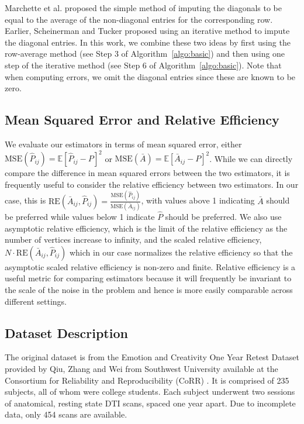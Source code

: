 \documentclass[10pt,letterpaper]{article}
\newcommand{\Ex}{\mathbb{E}}
\renewcommand{\hat}{\widehat}
\begin{document}
Marchette et al. \cite{marchette2011vertex}  proposed the simple method of imputing the diagonals to be equal to the average of the non-diagonal entries for the corresponding row.
Earlier, Scheinerman and Tucker \cite{scheinerman2010modeling} proposed using an iterative method to impute the diagonal entries.
In this work, we combine these two ideas by first using the row-average method  (see Step 3 of Algorithm~\ref{algo:basic}) and then using one step of the iterative method (see Step 6 of Algorithm~\ref{algo:basic}).
Note that when computing errors, we omit the diagonal entries since these are known to be zero.

\subsection{Mean Squared Error and Relative Efficiency}
\label{section:rel_eff}
We evaluate our estimators in terms of mean squared error, either $\mathrm{MSE}(\hat{P}_{ij})=\Ex[\hat{P}_{ij}-P]^2$ or $\mathrm{MSE}(\bar{A})=\Ex[\bar{A}_{ij}-P]^2$.
While we can directly compare the difference in mean squared errors between the two estimators, it is frequently useful to consider the relative efficiency between two estimators.
In our case, this is $\mathrm{RE}(\bar{A}_{ij},\hat{P}_{ij}) = \frac{\mathrm{MSE}(\hat{P}_{ij})}{\mathrm{MSE}(\bar{A}_{ij})}$, with values above 1 indicating $\bar{A}$ should be preferred while values below 1 indicate $\hat{P}$ should be preferred.
We also use asymptotic relative efficiency, which is the limit of the relative efficiency as the number of vertices increase to infinity, and the scaled relative efficiency, $N\cdot \mathrm{RE}(\bar{A}_{ij},\hat{P}_{ij}) $ which in our case normalizes the relative efficiency so that the asymptotic scaled relative efficiency is non-zero and finite.
Relative efficiency is a useful metric for comparing estimators because it will frequently be invariant to the scale of the noise in the problem and hence is more easily comparable across different settings.

\subsection{Dataset Description}
\label{section:data}
The original dataset is from the Emotion and Creativity One Year Retest Dataset provided by Qiu, Zhang and Wei from Southwest University available at the Consortium for Reliability and Reproducibility (CoRR) \cite{zuo2014open, gorgolewski2015high}. It is comprised of 235 subjects, all of whom were college students. Each subject underwent two sessions of anatomical, resting state DTI scans, spaced one year apart. Due to incomplete data, only 454 scans are available.
\end{document}
